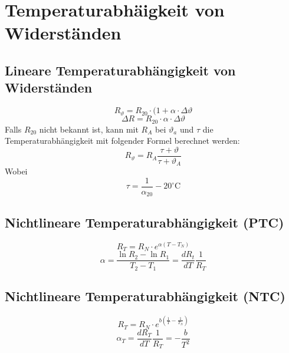



\section{Temperaturabhäigkeit von Widerständen}

\subsection{Lineare Temperaturabhängigkeit von Widerständen}
\[ R_\vartheta = R_{20} \cdot (1 + \alpha \cdot \Delta \vartheta \]
\[ \Delta R = R_{20} \cdot \alpha \cdot \Delta \vartheta \]
Falls $R_20$ nicht bekannt ist, kann mit $R_A$ bei $\vartheta_a$ und $\tau$ die Temperaturabhängigkeit mit folgender Formel berechnet werden:  \[ R_\vartheta = R_A \frac{\tau + \vartheta}{\tau + \vartheta_A} \]
Wobei 
\[ \tau = \frac{1}{\alpha_20} - 20^{\circ}\text{C} \]

\subsection{Nichtlineare Temperaturabhängigkeit (PTC)}
\[ R_T = R_N \cdot e^{\alpha (T - T_N)} \]
\[ \alpha = \frac{\ln R_2 - \ln R_1}{T_2 - T_1} = \frac{d R_t}{d T}\frac{1}{R_T} \]

\subsection{Nichtlineare Temperaturabhängigkeit (NTC)}
\[ R_T = R_N \cdot e^{b\left(\frac{1}{T} - \frac{1}{T_N}\right)} \]
\[ \alpha_T = \frac{d R_T}{d T}\frac{1}{R_T} = -\frac{b}{T^2} \]